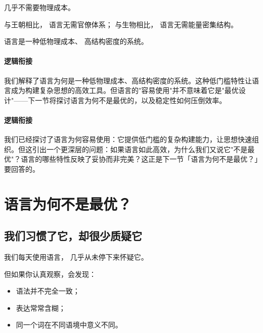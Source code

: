 \documentclass[../main.tex]{subfiles}
\begin{document}
	几乎不需要物理成本。

	与王朝相比，
	语言无需官僚体系；
	与生物相比，
	语言无需能量密集结构。

	\begin{readingnote}
		语言是一种低物理成本、
		高结构密度的系统。
	\end{readingnote}

	\paragraph*{逻辑衔接}
	我们解释了语言为何是一种低物理成本、高结构密度的系统。这种低门槛特性让语言成为构建复杂思想的高效工具。但语言的"容易使用"并不意味着它是"最优设计"——下一节将探讨语言为何不是最优的，以及稳定性如何压倒效率。




\paragraph*{逻辑衔接}
我们已经探讨了语言为何容易使用：它提供低门槛的复杂构建能力，让思想快速组织。但这引出一个更深层的问题：如果语言如此高效，为什么我们又说它"不是最优"？语言的哪些特性反映了妥协而非完美？这正是下一节「语言为何不是最优？」要回答的。


\section{语言为何不是最优？}

\subsection{我们习惯了它，却很少质疑它}

我们每天使用语言，
几乎从未停下来怀疑它。

但如果你认真观察，会发现：

\begin{itemize}
	\item 语法并不完全一致；
	\item 表达常常含糊；
	\item 同一个词在不同语境中意义不同。
\end{itemize}
\end{document}
